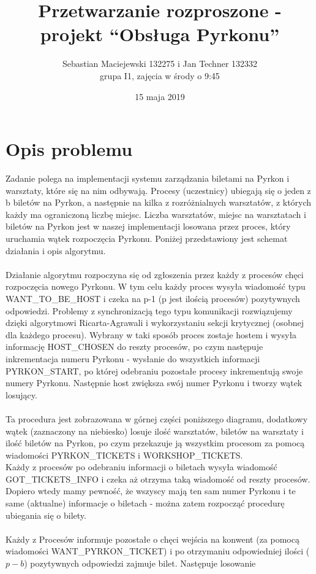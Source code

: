 \documentclass[10pt,a4paper]{article}
\author{Sebastian Maciejewski 132275 i Jan Techner 132332\\
grupa I1, zajęcia w środy o 9:45}
\title{Przetwarzanie rozproszone - projekt “Obsługa Pyrkonu”}
\date{15 maja 2019}
\begin{document}
\maketitle
\section{Opis problemu}
Zadanie polega na implementacji systemu zarządzania biletami na Pyrkon i warsztaty, które się na nim odbywają. Procesy (uczestnicy) ubiegają się o jeden z b biletów na Pyrkon,
a następnie na kilka z rozróżnialnych warsztatów, z których każdy ma ograniczoną liczbę miejsc. Liczba warsztatów, miejsc na warsztatach i biletów na Pyrkon jest
w naszej implementacji losowana przez proces, który uruchamia wątek rozpoczęcia Pyrkonu.
Poniżej przedstawiony jest schemat działania i opis algorytmu.\\
\\
Działanie algorytmu rozpoczyna się od zgłoszenia przez każdy z procesów chęci rozpoczęcia nowego Pyrkonu.
W tym celu każdy proces wysyła wiadomość typu WANT\_TO\_BE\_HOST i czeka na p-1 (p jest ilością procesów)
pozytywnych odpowiedzi. Problemy z synchronizacją tego typu komunikacji rozwiązujemy dzięki algorytmowi
Ricarta-Agrawali i wykorzystaniu sekcji krytycznej (osobnej dla każdego procesu).
Wybrany w taki sposób proces zostaje hostem i wysyła informację HOST\_CHOSEN do reszty procesów,
po czym następuje inkrementacja numeru Pyrkonu - wysłanie do wszystkich informacji PYRKON\_START,
po której odebraniu pozostałe procesy inkrementują swoje numery Pyrkonu. Następnie host zwiększa 
swój numer Pyrkonu i tworzy wątek losujący.\\
\\
Ta procedura jest zobrazowana w górnej części poniższego diagramu, dodatkowy wątek (zaznaczony na niebiesko)
losuje ilość warsztatów, biletów na warsztaty i ilość biletów na Pyrkon, po czym przekazuje ją
wszystkim procesom za pomocą wiadomości PYRKON\_TICKETS i WORKSHOP\_TICKETS.\\
Każdy z procesów po odebraniu informacji o biletach wysyła wiadomość GOT\_TICKETS\_INFO i czeka
aż otrzyma taką wiadomość od reszty procesów. Dopiero wtedy mamy pewność, że wszyscy mają ten
sam numer Pyrkonu i te same (aktualne) informacje o biletach - można zatem rozpocząć procedurę 
ubiegania się o bilety.\\
\\
Każdy z Procesów informuje pozostałe o chęci wejścia na konwent (za pomocą wiadomości WANT\_PYRKON\_TICKET)
i po otrzymaniu odpowiedniej ilości ($p-b$) pozytywnych odpowiedzi zajmuje bilet. Następuje losowanie
\end{document}
